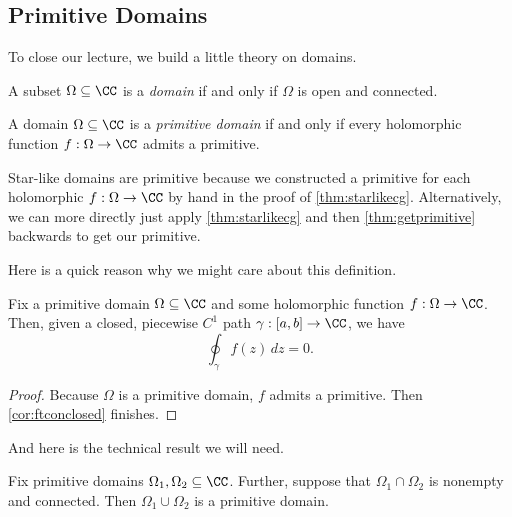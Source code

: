 \subsection{Primitive Domains}
To close our lecture, we build a little theory on domains.
\begin{definition}[Domain]
	A subset $\Omega\subseteq\CC$ is a \textit{domain} if and only if $\Omega$ is open and connected.
\end{definition}
\begin{definition}
	A domain $\Omega\subseteq\CC$ is a \textit{primitive domain} if and only if every holomorphic function $f:\Omega\to\CC$ admits a primitive.
\end{definition}
\begin{example}
	Star-like domains are primitive because we constructed a primitive for each holomorphic $f:\Omega\to\CC$ by hand in the proof of \autoref{thm:starlikecg}. Alternatively, we can more directly just apply \autoref{thm:starlikecg} and then \autoref{thm:getprimitive} backwards to get our primitive.
\end{example}
Here is a quick reason why we might care about this definition.
\begin{lemma} \label{lem:primitivepaths}
	Fix a primitive domain $\Omega\subseteq\CC$ and some holomorphic function $f:\Omega\to\CC$. Then, given a closed, piecewise $C^1$ path $\gamma:[a,b]\to\CC$, we have
	\[\oint_\gamma f(z)\,dz=0.\]
\end{lemma}
\begin{proof}
	Because $\Omega$ is a primitive domain, $f$ admits a primitive. Then \autoref{cor:ftconclosed} finishes.
\end{proof}
And here is the technical result we will need.
\begin{lemma}
	Fix primitive domains $\Omega_1,\Omega_2\subseteq\CC$. Further, suppose that $\Omega_1\cap\Omega_2$ is nonempty and connected. Then $\Omega_1\cup\Omega_2$ is a primitive domain.
\end{lemma}
